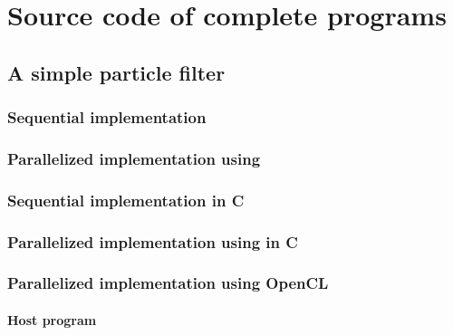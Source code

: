 \appendix

\chapter{Source code of complete programs}
\label{app:chap:Source code of complete programs}

\section{A simple particle filter}
\label{app:sec:A simle particle fitler}

\subsection{Sequential implementation}
\label{app:sub:Sequential implementation}


\subsection{Parallelized implementation using \protect\tbb}
\label{app:sub:Parallelized implementation using TBB}


\subsection{Sequential implementation in C}
\label{app:sub:Sequential implementation in C}


\subsection{Parallelized implementation using \protect\tbb in C}
\label{app:sub:Parallelized implementation using TBB in C}


\subsection{Parallelized implementation using OpenCL}
\label{app:sub:Parallelized implementation using OpenCL}

\subsubsection{Host program}
\label{app:sub:Host program}


